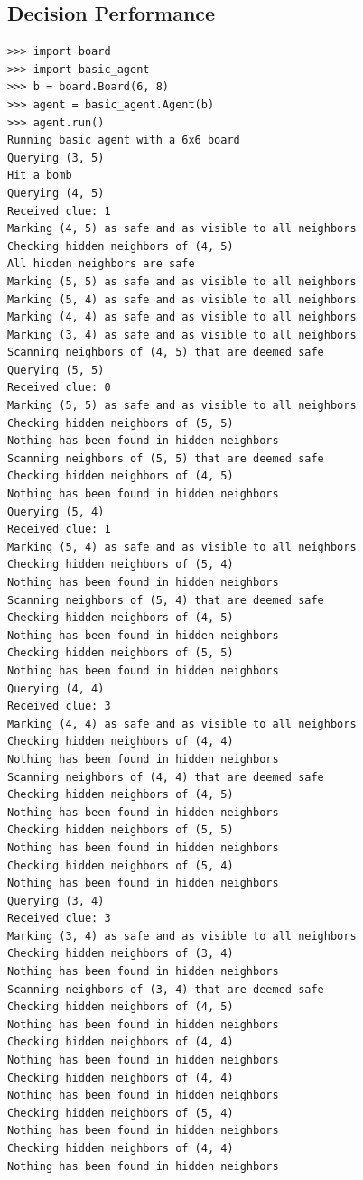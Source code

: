 \documentclass[13pt]{report}
\begin{document}
\subsection*{Decision Performance}
\begin{verbatim}
>>> import board           
>>> import basic_agent
>>> b = board.Board(6, 8)
>>> agent = basic_agent.Agent(b) 
>>> agent.run()
Running basic agent with a 6x6 board
Querying (3, 5)
Hit a bomb
Querying (4, 5)
Received clue: 1
Marking (4, 5) as safe and as visible to all neighbors
Checking hidden neighbors of (4, 5)
All hidden neighbors are safe
Marking (5, 5) as safe and as visible to all neighbors
Marking (5, 4) as safe and as visible to all neighbors
Marking (4, 4) as safe and as visible to all neighbors
Marking (3, 4) as safe and as visible to all neighbors
Scanning neighbors of (4, 5) that are deemed safe
Querying (5, 5)
Received clue: 0
Marking (5, 5) as safe and as visible to all neighbors
Checking hidden neighbors of (5, 5)
Nothing has been found in hidden neighbors
Scanning neighbors of (5, 5) that are deemed safe
Checking hidden neighbors of (4, 5)
Nothing has been found in hidden neighbors
Querying (5, 4)
Received clue: 1
Marking (5, 4) as safe and as visible to all neighbors
Checking hidden neighbors of (5, 4)
Nothing has been found in hidden neighbors
Scanning neighbors of (5, 4) that are deemed safe
Checking hidden neighbors of (4, 5)
Nothing has been found in hidden neighbors
Checking hidden neighbors of (5, 5)
Nothing has been found in hidden neighbors
Querying (4, 4)
Received clue: 3
Marking (4, 4) as safe and as visible to all neighbors
Checking hidden neighbors of (4, 4)
Nothing has been found in hidden neighbors
Scanning neighbors of (4, 4) that are deemed safe
Checking hidden neighbors of (4, 5)
Nothing has been found in hidden neighbors
Checking hidden neighbors of (5, 5)
Nothing has been found in hidden neighbors
Checking hidden neighbors of (5, 4)
Nothing has been found in hidden neighbors
Querying (3, 4)
Received clue: 3
Marking (3, 4) as safe and as visible to all neighbors
Checking hidden neighbors of (3, 4)
Nothing has been found in hidden neighbors
Scanning neighbors of (3, 4) that are deemed safe
Checking hidden neighbors of (4, 5)
Nothing has been found in hidden neighbors
Checking hidden neighbors of (4, 4)
Nothing has been found in hidden neighbors
Checking hidden neighbors of (4, 4)
Nothing has been found in hidden neighbors
Checking hidden neighbors of (5, 4)
Nothing has been found in hidden neighbors
Checking hidden neighbors of (4, 4)
Nothing has been found in hidden neighbors

\end{verbatim}
\end{document}
